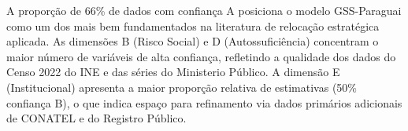 \medskip
\noindent A proporção de 66\% de dados com confiança A posiciona o modelo
GSS-Paraguai como um dos mais bem fundamentados na literatura de
relocação estratégica aplicada. As dimensões B (Risco Social) e D
(Autossuficiência) concentram o maior número de variáveis de alta
confiança, refletindo a qualidade dos dados do Censo 2022 do INE e das
séries do Ministerio Público. A dimensão E (Institucional) apresenta a
maior proporção relativa de estimativas (50\% confiança B), o que indica
espaço para refinamento via dados primários adicionais de CONATEL e do
Registro Público.
